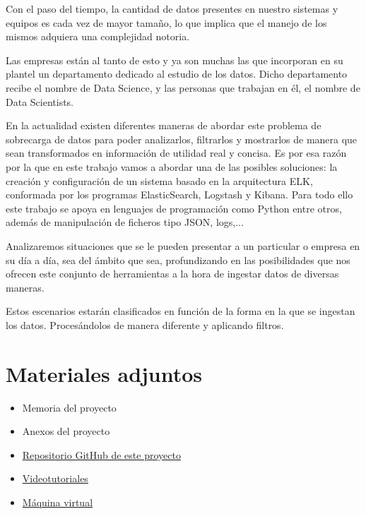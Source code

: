 
Con el paso del tiempo, la cantidad de datos presentes en nuestro sistemas y equipos es cada vez de mayor tamaño, lo que implica que el manejo de los mismos adquiera una complejidad notoria.

Las empresas están al tanto de esto y ya son muchas las que incorporan en su plantel un departamento dedicado al estudio de los datos. Dicho departamento recibe el nombre de Data Science, y las personas que trabajan en él, el nombre de Data Scientists.

En la actualidad existen diferentes maneras de abordar este problema de sobrecarga de datos para poder analizarlos, filtrarlos y mostrarlos de manera que sean transformados en información de utilidad real y concisa.
Es por esa razón por la que en este trabajo vamos a abordar una de las posibles soluciones: la creación y configuración de un sistema basado en la arquitectura ELK, conformada por los programas ElasticSearch, Logstash y Kibana. Para todo ello este trabajo se apoya en lenguajes de programación como Python entre otros, además de manipulación de ficheros tipo JSON, logs,...

Analizaremos situaciones que se le pueden presentar a un particular o empresa en su día a día, sea del ámbito que sea, profundizando en las posibilidades que nos ofrecen este conjunto de herramientas a la hora de ingestar datos de diversas maneras.

Estos escenarios estarán clasificados en función de la forma en la que se ingestan los datos. Procesándolos de manera diferente y aplicando filtros.

\section{Materiales adjuntos}

\begin{itemize}
    \item Memoria del proyecto
    \item Anexos del proyecto
    \item      \href{https://github.com/hds1001/Estudio-y-configuracion-de-un-sistema-ELK}{Repositorio GitHub de este proyecto}
    \item \href{https://universidaddeburgos-my.sharepoint.com/?view=0&id=%2Fpersonal%2Fhds1001%5Falu%5Fubu%5Fes%2FDocuments%2FV%C3%ADdeos%20TFG%20Hugo%20de%20la%20C%C3%A1mara%20Saiz}{Videotutoriales}
    \item \href{https://universidaddeburgos-my.sharepoint.com/:u:/g/personal/hds1001_alu_ubu_es/ESTYmbRsJbZHmz7oCoXCivsBb8y3Ot6gu-wmnZ5m5o0Gqw?e=GThg1p}{Máquina virtual}
\end{itemize}

